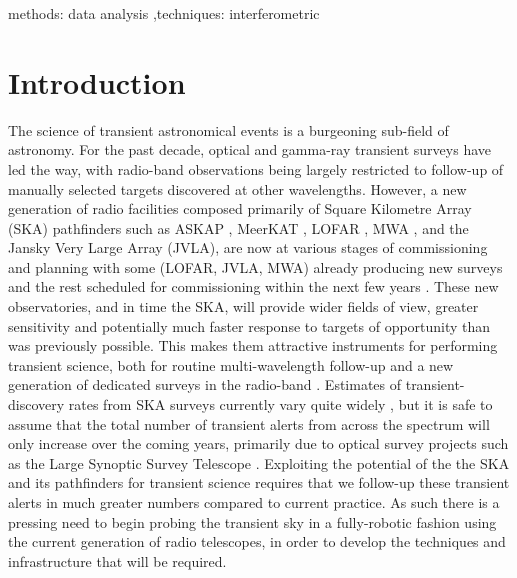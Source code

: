 \documentclass[5p,authoryear]{elsarticle}
\begin{document}
\begin{frontmatter}
\begin{abstract}
\end{abstract}

\begin{keyword}
methods: data analysis \sep  techniques: interferometric
\end{keyword}

\end{frontmatter}

\section{Introduction}
\label{sec:intro}
The science of transient astronomical events is a burgeoning sub-field of astronomy. 
For the past decade, optical and gamma-ray transient surveys have led the way, with radio-band observations being largely restricted to follow-up of manually selected targets discovered at other wavelengths.
However, a new generation of radio facilities composed primarily of Square Kilometre Array (SKA) pathfinders such as 
ASKAP \citep[the Australian Square Kilometre Array Pathfinder;][]{Murphy2013},
MeerKAT \citep[Karoo Array Telescope;][]{Booth2012}, 
LOFAR \citep[the Low Frequency Array;][]{vanHaarlem2013}, 
MWA \citep[Murchison Widefield Array;][]{Tingay2013,Bell2014}, 
and the Jansky Very Large Array (JVLA), are now at various stages of commissioning and planning with some (LOFAR, JVLA, MWA) already producing new surveys and the rest scheduled for commissioning within the next few years \citep[see e.g.][for an overiew]{Norris2013}.
These new observatories, and in time the SKA, will provide wider fields of view, 
greater sensitivity and potentially much faster response to targets of opportunity than was previously possible. 
This makes them attractive instruments for performing transient science, both for routine multi-wavelength follow-up and a new generation of dedicated surveys in the radio-band \citep{Stappers2013}. 
Estimates of transient-discovery rates from SKA surveys currently vary quite widely
\citep[see e.g.][for orphan gamma-ray burst rate estimates that differ by an order of magnitude, primarily due to different choices of signal-to-noise thresholds]{Burlon2015,Metzger2015}, but it is safe to assume that the total number of transient alerts from across the spectrum will only increase over the coming years, primarily due to optical survey projects such as the Large Synoptic Survey Telescope \citep{Ridgway2014}. 
Exploiting the potential of the the SKA and its pathfinders for transient science requires that we follow-up these transient alerts in much greater numbers compared to current practice. As such there is a pressing need to begin probing the transient sky in a fully-robotic fashion using the current generation of radio telescopes, in order to develop the techniques and infrastructure that will be required.
\end{document}
